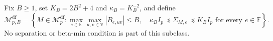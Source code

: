 Fix \(B\ge1\), set \(K_B=2B^2+4\) and \(\kappa_B=K_B^{-2}\), and define
\[
 \mathcal M_{p,B}^{\mathrm{df}}
 =\left\{M\in\mathcal M_p^{\mathrm{df}}:
 \max_{e\in\mathbb E}\max_{u,v\in\mathbb V}|B_{e,uv}|\le B,
 \quad
 \kappa_B I_p\preceq\Sigma_{M,e}\preceq K_BI_p
 \text{ for every }e\in\mathbb E\right\}.
\]
No separation or beta-min condition is part of this subclass.